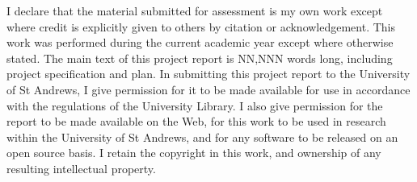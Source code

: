 I declare that the material submitted for assessment is my own work except
where credit is explicitly given to others by citation or acknowledgement. This
work was performed during the current academic year except where otherwise
stated. The main text of this project report is NN,NNN words long, including
project specification and plan. In submitting this project report to the
University of St Andrews, I give permission for it to be made available for use
in accordance with the regulations of the University Library. I also give
permission for the report to be made available on the Web, for this work to be
used in research within the University of St Andrews, and for any software to
be released on an open source basis. I retain the copyright in this work, and
ownership of any resulting intellectual property.